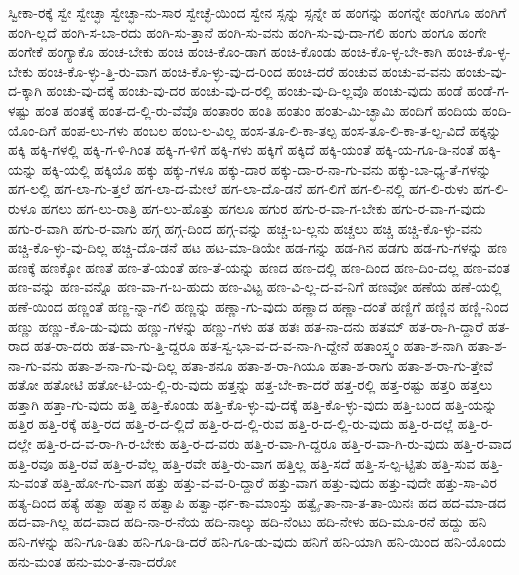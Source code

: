 {ಸ್ವೀಕಾ-ರಕ್ಕೆ
ಸ್ವೇ
ಸ್ವೇಚ್ಛಾ
ಸ್ವೇಚ್ಛಾ-ನು-ಸಾರ
ಸ್ವೇಚ್ಛೆ-ಯಿಂದ
ಸ್ವೇನ
ಸ್ಸನ್ನು
ಸ್ಸನ್ನೇ
ಹ
ಹಂಗನ್ನು
ಹಂಗನ್ನೇ
ಹಂಗಿಗೂ
ಹಂಗಿಗೆ
ಹಂಗಿ-ಲ್ಲದೆ
ಹಂಗಿ-ಸ-ಬಾ-ರದು
ಹಂಗಿ-ಸು-ತ್ತಾನೆ
ಹಂಗಿ-ಸು-ವನು
ಹಂಗಿ-ಸು-ವು-ದಾ-ಗಲಿ
ಹಂಗು
ಹಂಗೂ
ಹಂಗೇ
ಹಂಗೇಕೆ
ಹಂಗ್ಯಾಕೊ
ಹಂಚ-ಬೇಕು
ಹಂಚಿ
ಹಂಚಿ-ಕೊಂ-ಡಾಗ
ಹಂಚಿ-ಕೊಂಡು
ಹಂಚಿ-ಕೊ-ಳ್ಳ-ಬೇ-ಕಾಗಿ
ಹಂಚಿ-ಕೊ-ಳ್ಳ-ಬೇಕು
ಹಂಚಿ-ಕೊ-ಳ್ಳು-ತ್ತಿ-ರು-ವಾಗ
ಹಂಚಿ-ಕೊ-ಳ್ಳು-ವು-ದ-ರಿಂದ
ಹಂಚಿ-ದರೆ
ಹಂಚುವ
ಹಂಚು-ವ-ವನು
ಹಂಚು-ವು-ದ-ಕ್ಕಾಗಿ
ಹಂಚು-ವು-ದಕ್ಕೆ
ಹಂಚು-ವು-ದರ
ಹಂಚು-ವು-ದ-ರಲ್ಲಿ
ಹಂಚು-ವು-ದಿ-ಲ್ಲವೊ
ಹಂಚು-ವುದು
ಹಂಡೆ
ಹಂಡೆ-ಗ-ಳಷ್ಟು
ಹಂತ
ಹಂತಕ್ಕೆ
ಹಂತ-ದ-ಲ್ಲಿ-ರು-ವೆವೊ
ಹಂತಾರಂ
ಹಂತಿ
ಹಂತುಂ
ಹಂತು-ಮಿ-ಚ್ಛಾಮಿ
ಹಂದಿಗೆ
ಹಂದಿಯ
ಹಂದಿ-ಯೊಂ-ದಿಗೆ
ಹಂಪ-ಲು-ಗಳು
ಹಂಬಲ
ಹಂಬ-ಲ-ವಿಲ್ಲ
ಹಂಸ-ತೂ-ಲಿ-ಕಾ-ತಲ್ಪ
ಹಂಸ-ತೂ-ಲಿ-ಕಾ-ತ-ಲ್ಪ-ವಿದೆ
ಹಕ್ಕನ್ನು
ಹಕ್ಕಿ
ಹಕ್ಕಿ-ಗಳಲ್ಲಿ
ಹಕ್ಕಿ-ಗ-ಳಿ-ಗಿಂತ
ಹಕ್ಕಿ-ಗ-ಳಿಗೆ
ಹಕ್ಕಿ-ಗಳು
ಹಕ್ಕಿಗೆ
ಹಕ್ಕಿದೆ
ಹಕ್ಕಿ-ಯಂತೆ
ಹಕ್ಕಿ-ಯ-ಗೂ-ಡಿ-ನಂತೆ
ಹಕ್ಕಿ-ಯನ್ನು
ಹಕ್ಕಿ-ಯಲ್ಲಿ
ಹಕ್ಕಿಯೊ
ಹಕ್ಕು
ಹಕ್ಕು-ಗಳೂ
ಹಕ್ಕು-ದಾರ
ಹಕ್ಕು-ದಾ-ರ-ನಾ-ಗು-ವನು
ಹಕ್ಕು-ಬಾ-ಧ್ಯ-ತೆ-ಗಳನ್ನು
ಹಗ-ಲಲ್ಲಿ
ಹಗ-ಲಾ-ಗು-ತ್ತಲೆ
ಹಗ-ಲಾ-ದ-ಮೇಲೆ
ಹಗ-ಲಾ-ದೊ-ಡನೆ
ಹಗ-ಲಿಗೆ
ಹಗ-ಲಿ-ನಲ್ಲಿ
ಹಗ-ಲಿ-ರುಳು
ಹಗ-ಲಿ-ರುಳೂ
ಹಗಲು
ಹಗ-ಲು-ರಾತ್ರಿ
ಹಗ-ಲು-ಹೊತ್ತು
ಹಗಲೂ
ಹಗುರ
ಹಗು-ರ-ವಾ-ಗ-ಬೇಕು
ಹಗು-ರ-ವಾ-ಗ-ವುದು
ಹಗು-ರ-ವಾಗಿ
ಹಗು-ರ-ವಾಗು
ಹಗ್ಗ
ಹಗ್ಗ-ದಿಂದ
ಹಗ್ಗ-ವನ್ನು
ಹಚ್ಚ-ಬ-ಲ್ಲನು
ಹಚ್ಚಲು
ಹಚ್ಚಿ
ಹಚ್ಚಿ-ಕೊ-ಳ್ಳು-ವನು
ಹಚ್ಚಿ-ಕೊ-ಳ್ಳು-ವು-ದಿಲ್ಲ
ಹಚ್ಚಿ-ದೊ-ಡನೆ
ಹಟ
ಹಟ-ಮಾ-ಡಿಯೇ
ಹಡ-ಗನ್ನು
ಹಡ-ಗಿನ
ಹಡಗು
ಹಡ-ಗು-ಗಳನ್ನು
ಹಣ
ಹಣಕ್ಕೆ
ಹಣಕ್ಕೋ
ಹಣತೆ
ಹಣ-ತೆ-ಯಂತೆ
ಹಣ-ತೆ-ಯನ್ನು
ಹಣದ
ಹಣ-ದಲ್ಲಿ
ಹಣ-ದಿಂದ
ಹಣ-ದಿಂ-ದಲ್ಲ
ಹಣ-ವಂತ
ಹಣ-ವನ್ನು
ಹಣ-ವನ್ನೊ
ಹಣ-ವಾ-ಗ-ಬ-ಹುದು
ಹಣ-ವಿಟ್ಟ
ಹಣ-ವಿ-ಲ್ಲ-ದ-ವ-ನಿಗೆ
ಹಣವೋ
ಹಣೆಯ
ಹಣೆ-ಯಲ್ಲಿ
ಹಣೆ-ಯಿಂದ
ಹಣ್ಣಂತೆ
ಹಣ್ಣ-ನ್ನಾ-ಗಲಿ
ಹಣ್ಣನ್ನು
ಹಣ್ಣಾ-ಗು-ವುದು
ಹಣ್ಣಾದ
ಹಣ್ಣಾ-ದಂತೆ
ಹಣ್ಣಿಗೆ
ಹಣ್ಣಿನ
ಹಣ್ಣಿ-ನಿಂದ
ಹಣ್ಣು
ಹಣ್ಣು-ಕೊ-ಡು-ವುದು
ಹಣ್ಣು-ಗಳನ್ನು
ಹಣ್ಣು-ಗಳು
ಹತ
ಹತಃ
ಹತ-ನಾ-ದನು
ಹತಮ್
ಹತ-ರಾ-ಗಿ-ದ್ದಾರೆ
ಹತ-ರಾದ
ಹತ-ರಾ-ದರು
ಹತ-ವಾ-ಗು-ತ್ತಿ-ದ್ದರೂ
ಹತ-ಸ್ವ-ಭಾ-ವ-ದ-ವ-ನಾ-ಗಿ-ದ್ದೇನೆ
ಹತಾಂಸ್ತ್ವಂ
ಹತಾ-ಶ-ನಾಗಿ
ಹತಾ-ಶ-ನಾ-ಗು-ವನು
ಹತಾ-ಶ-ನಾ-ಗು-ವು-ದಿಲ್ಲ
ಹತಾ-ಶನೂ
ಹತಾ-ಶ-ರಾ-ಗಿಯೂ
ಹತಾ-ಶ-ರಾಗು
ಹತಾ-ಶ-ರಾ-ಗು-ತ್ತೇವೆ
ಹತೋ
ಹತೋಟಿ
ಹತೋ-ಟಿ-ಯ-ಲ್ಲಿ-ರು-ವುದು
ಹತ್ತನ್ನು
ಹತ್ತ-ಬೇ-ಕಾ-ದರೆ
ಹತ್ತ-ರಲ್ಲಿ
ಹತ್ತ-ರಷ್ಟು
ಹತ್ತರಿ
ಹತ್ತಲು
ಹತ್ತಾಗಿ
ಹತ್ತಾ-ಗು-ವುದು
ಹತ್ತಿ
ಹತ್ತಿ-ಕೊಂಡು
ಹತ್ತಿ-ಕೊ-ಳ್ಳು-ವು-ದಕ್ಕೆ
ಹತ್ತಿ-ಕೊ-ಳ್ಳು-ವುದು
ಹತ್ತಿ-ಬಂದ
ಹತ್ತಿ-ಯನ್ನು
ಹತ್ತಿರ
ಹತ್ತಿ-ರಕ್ಕೆ
ಹತ್ತಿ-ರದ
ಹತ್ತಿ-ರ-ದ-ಲ್ಲಿದೆ
ಹತ್ತಿ-ರ-ದ-ಲ್ಲಿ-ರುವ
ಹತ್ತಿ-ರ-ದ-ಲ್ಲಿ-ರು-ವುದು
ಹತ್ತಿ-ರ-ದಲ್ಲೆ
ಹತ್ತಿ-ರ-ದಲ್ಲೇ
ಹತ್ತಿ-ರ-ದ-ವ-ರಾ-ಗಿ-ರ-ಬೇಕು
ಹತ್ತಿ-ರ-ದ-ವರು
ಹತ್ತಿ-ರ-ವಾ-ಗಿ-ದ್ದರೂ
ಹತ್ತಿ-ರ-ವಾ-ಗಿ-ರು-ವುದು
ಹತ್ತಿ-ರ-ವಾದ
ಹತ್ತಿ-ರವೂ
ಹತ್ತಿ-ರವೆ
ಹತ್ತಿ-ರ-ವೆಲ್ಲ
ಹತ್ತಿ-ರವೇ
ಹತ್ತಿ-ರು-ವಾಗ
ಹತ್ತಿಲ್ಲ
ಹತ್ತಿ-ಸದೆ
ಹತ್ತಿ-ಸ-ಲ್ಪ-ಟ್ಟಿತು
ಹತ್ತಿ-ಸುವ
ಹತ್ತಿ-ಸು-ವಂತೆ
ಹತ್ತಿ-ಹೋ-ಗು-ವಾಗ
ಹತ್ತು
ಹತ್ತು-ವ-ವ-ರಿ-ದ್ದಾರೆ
ಹತ್ತು-ವಾಗ
ಹತ್ತು-ವುದು
ಹತ್ತು-ವುದೇ
ಹತ್ತು-ಸಾ-ವಿರ
ಹತ್ಯ-ದಿಂದ
ಹತ್ಯೆ
ಹತ್ವಾ
ಹತ್ವಾನ
ಹತ್ವಾಪಿ
ಹತ್ವಾ-ರ್ಥ-ಕಾ-ಮಾಂಸ್ತು
ಹತ್ವೈ-ತಾ-ನಾ-ತ-ತಾ-ಯಿನಃ
ಹದ
ಹದ-ಮಾ-ಡದ
ಹದ-ವಾ-ಗಿಲ್ಲ
ಹದ-ವಾದ
ಹದಿ-ನಾ-ರ-ನೆಯ
ಹದಿ-ನಾಲ್ಕು
ಹದಿ-ನೆಂಟು
ಹದಿ-ನೇಳು
ಹದಿ-ಮೂ-ರನೆ
ಹದ್ದು
ಹನಿ
ಹನಿ-ಗಳನ್ನು
ಹನಿ-ಗೂ-ಡಿತು
ಹನಿ-ಗೂ-ಡಿ-ದರೆ
ಹನಿ-ಗೂ-ಡು-ವುದು
ಹನಿಗೆ
ಹನಿ-ಯಾಗಿ
ಹನಿ-ಯಿಂದ
ಹನಿ-ಯೊಂದು
ಹನು-ಮಂತ
ಹನು-ಮಂ-ತ-ನಾ-ದರೋ
}
